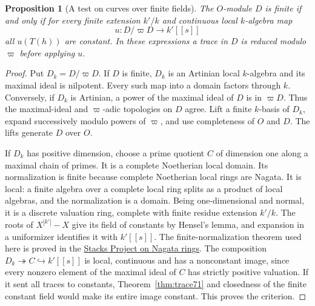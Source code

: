 \documentclass[a4paper,11pt]{article}
\newtheorem{proposition}{Proposition}[section]
\theoremstyle{definition}
\theoremstyle{remark}
\numberwithin{equation}{section}
\begin{document}
\begin{proposition}[A test on curves over finite fields]\label{prop:curve71}
The \(O\)-module \(D\) is finite if and only if for every finite
extension \(k'/k\) and continuous local \(k\)-algebra map
\[
                   u:D/\varpi D\longrightarrow k'[[s]]
\]
all \(u(T(h))\) are constant. In these expressions a trace in
\(D\) is reduced modulo \(\varpi\) before applying \(u\).
\end{proposition}
\begin{proof}
Put \(D_k=D/\varpi D\). If \(D\) is finite, \(D_k\) is an
Artinian local \(k\)-algebra and its maximal ideal is nilpotent.
Every such map into a domain factors through \(k\). Conversely,
if \(D_k\) is Artinian, a power of the maximal ideal of \(D\)
is in \(\varpi D\). Thus the maximal-ideal and
\(\varpi\)-adic topologies on \(D\) agree. Lift a finite
\(k\)-basis of \(D_k\), expand successively modulo powers of
\(\varpi\), and use completeness of \(O\) and \(D\).
The lifts generate \(D\) over \(O\).

If \(D_k\) has positive dimension, choose a prime quotient
\(C\) of dimension one along a maximal chain of primes. It is
a complete Noetherian local domain. Its normalization is finite
because complete Noetherian local rings are Nagata.
It is local: a finite algebra over a complete local ring splits
as a product of local algebras, and the normalization is a
domain. Being one-dimensional and normal, it is a discrete
valuation ring, complete with finite residue extension \(k'/k\).
The roots of \(X^{|k'|}-X\) give its field of constants by
Hensel's lemma, and expansion in a uniformizer identifies it with
\(k'[[s]]\). The finite-normalization theorem used here is proved in the
\href{https://stacks.math.columbia.edu/tag/032E}{Stacks Project on Nagata rings}.
The composition \(D_k\twoheadrightarrow C\hookrightarrow k'[[s]]\)
is local, continuous and has a nonconstant image, since
every nonzero element of the maximal ideal of \(C\) has
strictly positive valuation. If it sent all traces to constants,
Theorem~\ref{thm:trace71} and closedness of the finite constant
field would make its entire image constant. This proves the
criterion.
\end{proof}
\end{document}
